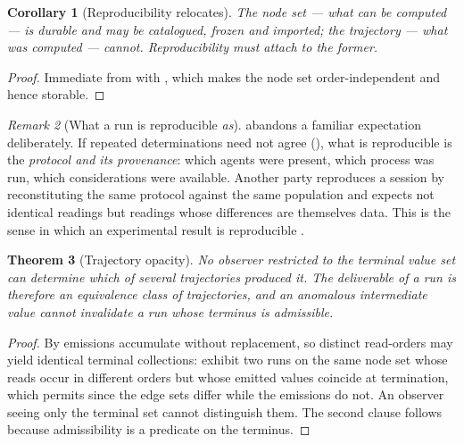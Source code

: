\documentclass[11pt,a4paper]{article}
\theoremstyle{clstyle}
\newtheorem{theorem}{Theorem}[section]
\newtheorem{corollary}[theorem]{Corollary}
\theoremstyle{definition}
\theoremstyle{remark}
\newtheorem{remark}[theorem]{Remark}
\begin{document}
\begin{corollary}[Reproducibility relocates]
\label{cor:repro}
The node set --- what \emph{can} be computed --- is durable and may be
catalogued, frozen and imported; the trajectory --- what \emph{was}
computed --- cannot. Reproducibility must attach to the former.
\end{corollary}

\begin{proof}
Immediate from  with , which makes
the node set order-independent and hence storable.
\end{proof}

\begin{remark}[What a run is reproducible \emph{as}]
\label{rem:repro-meaning}
 abandons a familiar expectation deliberately. If repeated
determinations need not agree (), what is reproducible
is the \emph{protocol and its provenance}: which agents were present, which
process was run, which considerations were available. Another party
reproduces a session by reconstituting the same protocol against the same
population and expects not identical readings but readings whose differences
are themselves data. This is the sense in which an experimental result is
reproducible \citep{peng2011reproducible,sandve2013ten,moreau2013prov,
openscience2015estimating}.
\end{remark}

\begin{theorem}[Trajectory opacity]
\label{thm:opacity}
No observer restricted to the terminal value set can determine which of
several trajectories produced it. The deliverable of a run is therefore an
equivalence class of trajectories, and an anomalous intermediate value cannot
invalidate a run whose terminus is admissible.
\end{theorem}

\begin{proof}
By  emissions accumulate without replacement, so distinct
read-orders may yield identical terminal collections: exhibit two runs on the
same node set whose reads occur in different orders but whose emitted values
coincide at termination, which  permits since the edge sets
differ while the emissions do not. An observer seeing only the terminal set
cannot distinguish them. The second clause follows because admissibility is a
predicate on the terminus.
\end{proof}
\end{document}
